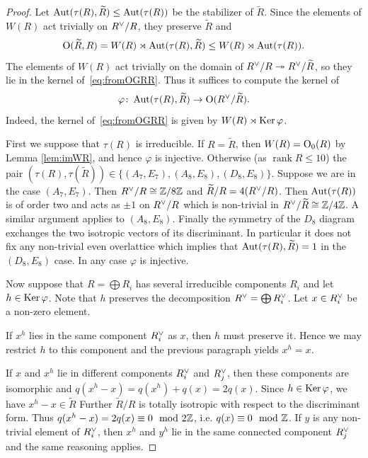 \documentclass{amsart}
\numberwithin{procedure}{section}
\DeclareMathOperator{\rk}{rank}
\newcommand{\rl}{R}
\newcommand{\trl}{\widetilde{\rl}}
\newcommand{\arl}{\Aut(\tau(\rl))}
\renewcommand{\ker}{\Ker}
\begin{document}
\begin{proof}
 Let $\Aut(\tau(\rl), \trl) \leq \arl$ be the stabilizer of $\trl$. 
 Since the elements of $W(\rl)$ act trivially on $\rl\dual /\rl$, they preserve $\trl$ and
\[
\OG(\trl, \rl)=W(\rl) \rtimes \Aut(\tau(\rl),\trl) \leq W(\rl) \rtimes \Aut(\tau(\rl)).
\]
 The elements of $W(\rl)$ act trivially on the domain of $\rl\dual /\rl \twoheadrightarrow \rl\dual  / \trl$, 
 so they lie in the kernel of~\eqref{eq:fromOGRR}.
 Thus it suffices to compute the kernel of
 \[\varphi\colon \Aut(\tau(\rl), \trl) \rightarrow \OG(\rl\dual /\trl).\]
Indeed, the kernel of~\eqref{eq:fromOGRR} is given by $W(R) \rtimes \ker \varphi$.
 \par
 First we suppose that $\tau(\rl)$ is irreducible.
 If $\rl = \trl$, then $W(\rl)=\OG_0(\rl)$ by Lemma \ref{lem:imWR}, and hence $\varphi$ is injective.
 Otherwise (as $\rk \rl \leq 10$) the pair
 $(\tau(\rl),\tau(\trl)) \in \{(A_7,E_7),(A_8,E_8), (D_8,E_8)\}$.
 Suppose we are in the case $(A_7,E_7)$. Then $\rl\dual /\rl \cong \Z/8\Z$ and $\trl/\rl = 4 (\rl\dual /\rl)$.
 Then $\arl$ is of order two and acts as $\pm 1$ on $\rl\dual /\rl$ which is non-trivial in
 $\rl\dual /\trl \cong \Z/4\Z$.
 A similar argument applies to $(A_8,E_8)$.
 Finally the symmetry of the $D_8$ diagram
 exchanges the two isotropic vectors of its discriminant.
 In particular it does not fix any non-trivial even overlattice 
 which implies that $\Aut(\tau(\rl),\trl)=1$ in the $(D_8,E_8)$ case. In any case $\varphi$ is injective.
\par
 Now suppose that $\rl=\bigoplus \rl_i$ has several irreducible components $\rl_i$ and
 let $h \in \ker \varphi$. 
 Note that $h$ preserves the decomposition $\rl\dual=\bigoplus \rl_i\dual $.
 Let $x \in \rl_i\dual $ be a non-zero element.
\par
 If $x^h$ lies in the same component $\rl_i\dual $ as $x$, then $h$ must preserve it.
 Hence we may restrict $h$ to this component and the previous paragraph yields $x^h=x$.
\par
 If $x$ and $x^h$ lie in different components $\rl_i\dual $ and $\rl_j\dual $,
 then these components are isomorphic and $q(x^h-x)=q(x^h)+q(x) = 2q(x)$.
 Since $h \in \ker \varphi$,
 we have $x^h - x \in \trl$ 
 Further $\trl/\rl$ is totally isotropic with respect to the discriminant form. 
 Thus $q(x^h-x)=2q(x) \equiv 0 \mod 2\mathord{\mathbb Z}$, i.e. $q(x) \equiv 0 \mod {\mathord{\mathbb Z}}$.
 If $y$ is any non-trivial element of $\rl_i\dual $, 
 then $x^h$ and $y^h$ lie in the same connected component $\rl_j\dual $ 
 and the same reasoning applies. 

\end{proof}
\end{document}

